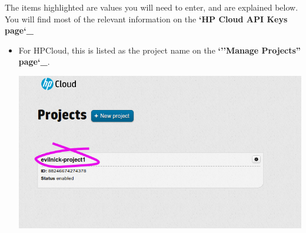 \documentclass[letterpaper,10pt,english]{sphinxmanual}
\begin{document}
The items highlighted are values you will need to enter, and are
explained below. You will find most of the relevant information on the
{\color{red}\bfseries{}{}`HP Cloud API Keys page{}`\_}
\begin{itemize}
\item {} 
 For HPCloud, this is listed as the project name on
the {\color{red}\bfseries{}{}`''Manage Projects'' page{}`\_}.

\includegraphics{getting_started-hpc-tenant.png}

\end{itemize}
\end{document}
